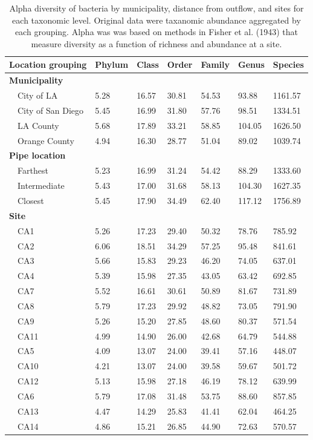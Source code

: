 \documentclass[letterpaper,12pt]{article}\usepackage[]{graphicx}\usepackage[]{color}
\begin{document}
\begin{table}[!tbp]
\caption{Alpha diversity of bacteria by municipality, distance from outflow, and sites for each taxonomic level.  Original data were taxanomic abundance aggregated by each grouping.  Alpha was was based on methods in Fisher et al. (1943) that measure diversity as a function of richness and abundance at a site.\label{tab:alpha_bac}} 
\begin{center}
\begin{tabular}{lllllll}
\hline\hline
\multicolumn{1}{l}{Location grouping}&\multicolumn{1}{c}{Phylum}&\multicolumn{1}{c}{Class}&\multicolumn{1}{c}{Order}&\multicolumn{1}{c}{Family}&\multicolumn{1}{c}{Genus}&\multicolumn{1}{c}{Species}\tabularnewline
\hline
{\bfseries Municipality}&&&&&&\tabularnewline
~~City of LA&5.28&16.57&30.81&54.53& 93.88&1161.57\tabularnewline
~~City of San Diego&5.45&16.99&31.80&57.76& 98.51&1334.51\tabularnewline
~~LA County&5.68&17.89&33.21&58.85&104.05&1626.50\tabularnewline
~~Orange County&4.94&16.30&28.77&51.04& 89.02&1039.74\tabularnewline
\hline
{\bfseries Pipe location}&&&&&&\tabularnewline
~~Farthest&5.23&16.99&31.24&54.42& 88.29&1333.60\tabularnewline
~~Intermediate&5.43&17.00&31.68&58.13&104.30&1627.35\tabularnewline
~~Closest&5.45&17.90&34.49&62.40&117.12&1756.89\tabularnewline
\hline
{\bfseries Site}&&&&&&\tabularnewline
~~CA1&5.26&17.23&29.40&50.32& 78.76& 785.92\tabularnewline
~~CA2&6.06&18.51&34.29&57.25& 95.48& 841.61\tabularnewline
~~CA3&5.66&15.83&29.23&46.20& 74.05& 637.01\tabularnewline
~~CA4&5.39&15.98&27.35&43.05& 63.42& 692.85\tabularnewline
~~CA7&5.52&16.61&30.61&50.89& 81.67& 731.89\tabularnewline
~~CA8&5.79&17.23&29.92&48.82& 73.05& 791.90\tabularnewline
~~CA9&5.26&15.20&27.85&48.60& 80.37& 571.54\tabularnewline
~~CA11&4.99&14.90&26.00&42.68& 64.79& 544.88\tabularnewline
~~CA5&4.09&13.07&24.00&39.41& 57.16& 448.07\tabularnewline
~~CA10&4.21&13.07&24.00&39.58& 59.67& 501.72\tabularnewline
~~CA12&5.13&15.98&27.18&46.19& 78.12& 639.99\tabularnewline
~~CA6&5.79&17.08&31.48&53.75& 88.60& 857.85\tabularnewline
~~CA13&4.47&14.29&25.83&41.41& 62.04& 464.25\tabularnewline
~~CA14&4.86&15.21&26.85&44.90& 72.63& 570.57\tabularnewline
\hline
\end{tabular}\end{center}
\end{table}
\end{document}
